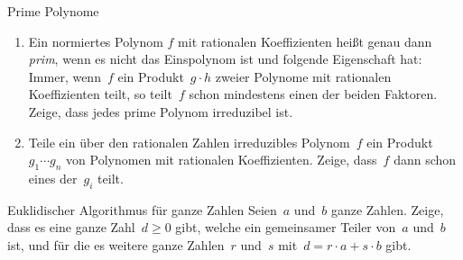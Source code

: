 \documentclass{algblatt}
\begin{document}
\begin{aufgabe}{Prime Polynome}
\begin{enumerate}
\item Ein normiertes Polynom $f$ mit rationalen Koeffizienten heißt
genau dann \emph{prim}, wenn es nicht das Einspolynom ist und folgende
Eigenschaft hat: Immer, wenn~$f$ ein
Produkt~$g \cdot h$ zweier Polynome mit
rationalen Koeffizienten teilt, so teilt~$f$ schon mindestens einen der
beiden Faktoren. Zeige, dass jedes prime Polynom irreduzibel ist.
\item Teile ein über den rationalen Zahlen irreduzibles Polynom~$f$ ein
Produkt~$g_1 \cdots g_n$ von Polynomen mit rationalen Koeffizienten.
Zeige, dass~$f$ dann schon eines der~$g_i$ teilt.
\end{enumerate}
\end{aufgabe}

\begin{aufgabe}{Euklidischer Algorithmus für ganze Zahlen}
Seien~$a$ und~$b$ ganze Zahlen. Zeige, dass es eine ganze Zahl~$d
\geq 0$ gibt, welche ein gemeinsamer Teiler von~$a$ und~$b$ ist, und für die es
weitere ganze Zahlen~$r$ und~$s$ mit~$d = r \cdot a + s \cdot b$ gibt.
\end{aufgabe}
 
\end{document}
